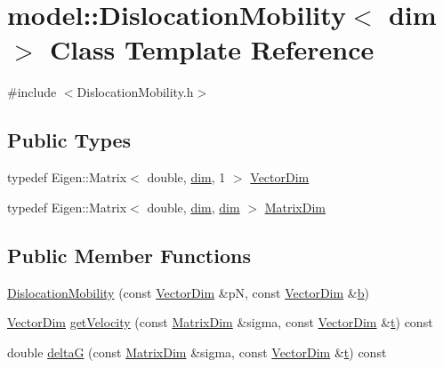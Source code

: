 \hypertarget{classmodel_1_1_dislocation_mobility}{}\section{model\+:\+:Dislocation\+Mobility$<$ dim $>$ Class Template Reference}
\label{classmodel_1_1_dislocation_mobility}


{\ttfamily \#include $<$Dislocation\+Mobility.\+h$>$}

\subsection*{Public Types}
\begin{DoxyCompactItemize}
\item 
typedef Eigen\+::\+Matrix$<$ double, \hyperlink{plot_nd_a_8m_a382f3ca768b275b8d563604f7fc7df73}{dim}, 1 $>$ \hyperlink{classmodel_1_1_dislocation_mobility_add1b850a21bdb55ae123917bf02022d0}{Vector\+Dim}
\item 
typedef Eigen\+::\+Matrix$<$ double, \hyperlink{plot_nd_a_8m_a382f3ca768b275b8d563604f7fc7df73}{dim}, \hyperlink{plot_nd_a_8m_a382f3ca768b275b8d563604f7fc7df73}{dim} $>$ \hyperlink{classmodel_1_1_dislocation_mobility_a7b0acb89b305f6b042fbcd1b6fd9a06a}{Matrix\+Dim}
\end{DoxyCompactItemize}
\subsection*{Public Member Functions}
\begin{DoxyCompactItemize}
\item 
\hyperlink{classmodel_1_1_dislocation_mobility_a22439d926c3be7dc7e303102d080c596}{Dislocation\+Mobility} (const \hyperlink{classmodel_1_1_dislocation_mobility_add1b850a21bdb55ae123917bf02022d0}{Vector\+Dim} \&p\+N, const \hyperlink{classmodel_1_1_dislocation_mobility_add1b850a21bdb55ae123917bf02022d0}{Vector\+Dim} \&\hyperlink{generate_loop_8m_a8628bb51afad38fac21e20697927b6cb}{b})
\item 
\hyperlink{classmodel_1_1_dislocation_mobility_add1b850a21bdb55ae123917bf02022d0}{Vector\+Dim} \hyperlink{classmodel_1_1_dislocation_mobility_a82b03d11232f78b807da689608a44c97}{get\+Velocity} (const \hyperlink{classmodel_1_1_dislocation_mobility_a7b0acb89b305f6b042fbcd1b6fd9a06a}{Matrix\+Dim} \&sigma, const \hyperlink{classmodel_1_1_dislocation_mobility_add1b850a21bdb55ae123917bf02022d0}{Vector\+Dim} \&\hyperlink{_cubic_spline_intersection_8m_a83f7cd78c84d2604d0862bd818b9ac29}{t}) const 
\item 
double \hyperlink{classmodel_1_1_dislocation_mobility_a0499efe19cac173504f573a7cb13dc65}{delta\+G} (const \hyperlink{classmodel_1_1_dislocation_mobility_a7b0acb89b305f6b042fbcd1b6fd9a06a}{Matrix\+Dim} \&sigma, const \hyperlink{classmodel_1_1_dislocation_mobility_add1b850a21bdb55ae123917bf02022d0}{Vector\+Dim} \&\hyperlink{_cubic_spline_intersection_8m_a83f7cd78c84d2604d0862bd818b9ac29}{t}) const 
\end{DoxyCompactItemize}
